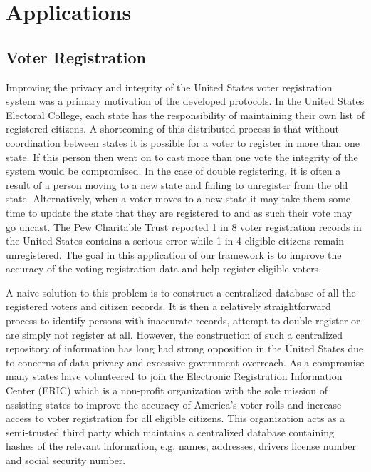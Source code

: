 \section{Applications}\label{sec:app}
\subsection{Voter Registration}\label{sec:voter}

Improving the privacy and integrity of the United States voter registration system was a primary motivation of the developed protocols. In  the United States Electoral College, each state has the responsibility of maintaining their own list of registered citizens. A shortcoming of this distributed process is that without coordination between states it is possible for a voter to register in more than one state. If this person then went on to cast more than one vote the integrity of the system would be compromised. In the case of double registering, it is often a result of a person moving to a new state and failing to unregister from the old state. Alternatively, when a voter moves to a new state it may take them some time to update the state that they are registered to and as such their vote may go uncast. The Pew Charitable Trust\cite{pew} reported 1 in 8 voter registration records in the United States contains a serious error while 1 in 4 eligible citizens remain unregistered. The goal in this application of our framework is to improve the accuracy of the voting registration data and help register eligible voters. 

A naive solution to this problem is to construct a centralized database of all the registered voters and citizen records. It is then a relatively straightforward process to identify persons with inaccurate records, attempt to double register or are simply not register at all. However, the construction of such a centralized repository of information has long had strong opposition in the United States due to concerns of data privacy and  excessive government overreach. As a compromise many states have volunteered to join the Electronic Registration Information Center (ERIC)\cite{eric} which is a non-profit organization with the sole mission of assisting states to improve the accuracy of America’s voter rolls and increase access to voter registration for all eligible citizens. This organization acts as a semi-trusted third party which maintains a centralized database containing hashes of the relevant information, e.g. names, addresses, drivers license number and social security number. 


